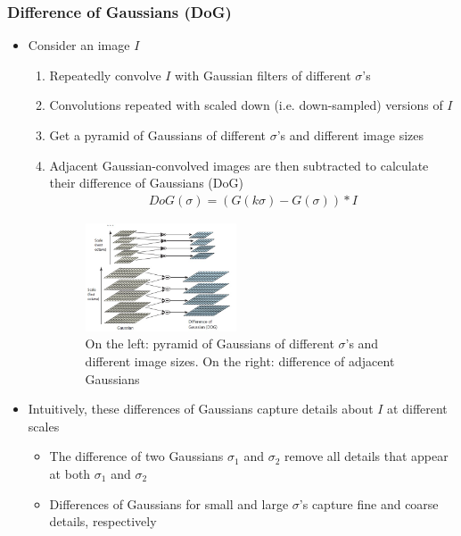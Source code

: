 \documentclass[letterpaper,12pt]{article}
\begin{document}
\subsubsection{Difference of Gaussians (DoG)}
\begin{itemize}
 \item Consider an image $I$
       \begin{enumerate}
        \item Repeatedly convolve $I$ with Gaussian filters of different $\sigma$'s
        \item Convolutions repeated with scaled down (i.e. down-sampled) versions of $I$
        \item Get a pyramid of Gaussians of different $\sigma$'s and different image sizes
        \item Adjacent Gaussian-convolved images are then subtracted to calculate their difference of Gaussians (DoG)
              \begin{align}
               DoG(\sigma) = (G(k\sigma) - G(\sigma)) * I
              \end{align}
              \begin{figure}[h]
               \centering
               \includegraphics[width=0.45\textwidth]{images/dog_pyramid.jpg}
               \caption{On the left: pyramid of Gaussians of different $\sigma$'s and different image sizes. On the right: difference of adjacent Gaussians}
              \end{figure}
       \end{enumerate}
 \item Intuitively, these differences of Gaussians capture details about $I$ at different scales
       \begin{itemize}
        \item The difference of two Gaussians $\sigma_1$ and $\sigma_2$ remove all details that appear at both $\sigma_1$ and $\sigma_2$
        \item Differences of Gaussians for small and large $\sigma$'s capture fine and coarse details, respectively
       \end{itemize}

\end{itemize}
\end{document}
